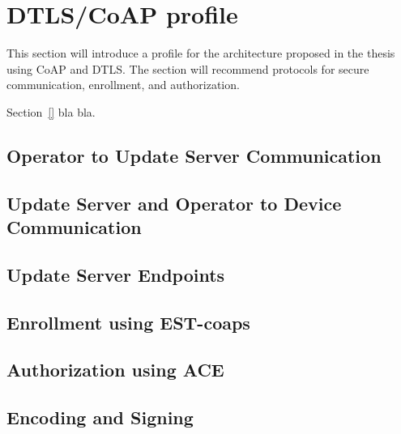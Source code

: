 \documentclass[0-thesis.tex]{subfiles}
\begin{document}
\label{chap:profiles}

\section{DTLS/CoAP profile}
\label{sec:dtls-coap-profile}
This section will introduce a profile for the architecture proposed in the thesis using
CoAP and DTLS. The section will recommend protocols for secure communication, enrollment,
and authorization. 

Section~\ref{} bla bla.

\subsection{Operator to Update Server Communication}
\label{ssec:operator-to-update-server}

\subsection{Update Server and Operator to Device Communication}
\label{ssec:update-server-and-operator-to-device}

\subsection{Update Server Endpoints}
\label{ssec:update-server-endpoints}

\subsection{Enrollment using EST-coaps}
\label{ssec:enrollment-est}

\subsection{Authorization using ACE}
\label{ssec:authorization-ace}


\subsection{Encoding and Signing}
\label{ssec:encoding-signing}
\end{document}
